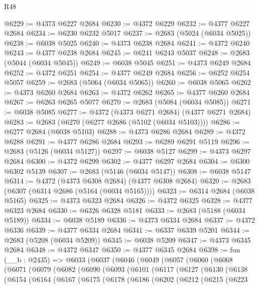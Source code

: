 \begin{lexlean}{R48}
\begin{coremodule}
@6229 := @4373 @6227 @2684
@6230 := @4372 @6229
@6232 := @4377 @6227 @2684
@6234 := @6230 @6232 @5017
@6237 := @2683 (@5024 (@6034 @5025))
@6238 := @6038 @5025
@6240 := @4373 @6238 @2684
@6241 := @4372 @6240
@6243 := @4377 @6238 @2684
@6245 := @6241 @6243 @5037
@6248 := @2683 (@5044 (@6034 @5045))
@6249 := @6038 @5045
@6251 := @4373 @6249 @2684
@6252 := @4372 @6251
@6254 := @4377 @6249 @2684
@6256 := @6252 @6254 @5057
@6259 := @2683 (@5064 (@6034 @5065))
@6260 := @6038 @5065
@6262 := @4373 @6260 @2684
@6263 := @4372 @6262
@6265 := @4377 @6260 @2684
@6267 := @6263 @6265 @5077
@6270 := @2683 (@5084 (@6034 @5085))
@6271 := @6038 @5085
@6277 := @4372 (@4373 @6271 @2684) (@4377 @6271 @2684)
@6283 := @2683 (@6270 (@6277 @2686 (@5102 (@6034 @5103))))
@6286 := @6277 @2684 (@6038 @5103)
@6288 := @4373 @6286 @2684
@6289 := @4372 @6288
@6291 := @4377 @6286 @2684
@6293 := @6289 @6291 @5119
@6296 := @2683 (@5126 (@6034 @5127))
@6297 := @6038 @5127
@6299 := @4373 @6297 @2684
@6300 := @4372 @6299
@6302 := @4377 @6297 @2684
@6304 := @6300 @6302 @5139
@6307 := @2683 (@5146 (@6034 @5147))
@6308 := @6038 @5147
@6314 := @4372 (@4373 @6308 @2684) (@4377 @6308 @2684)
@6320 := @2683 (@6307 (@6314 @2686 (@5164 (@6034 @5165))))
@6323 := @6314 @2684 (@6038 @5165)
@6325 := @4373 @6323 @2684
@6326 := @4372 @6325
@6328 := @4377 @6323 @2684
@6330 := @6326 @6328 @5181
@6333 := @2683 (@5188 (@6034 @5189))
@6334 := @6038 @5189
@6336 := @4373 @6334 @2684
@6337 := @4372 @6336
@6339 := @4377 @6334 @2684
@6341 := @6337 @6339 @5201
@6344 := @2683 (@5208 (@6034 @5209))
@6345 := @6038 @5209
@6347 := @4373 @6345 @2684
@6348 := @4372 @6347
@6350 := @4377 @6345 @2684
@6398 := fun (__b : @2435) =>
  @6033
    (@6037
      (@6046
        (@6049
          (@6057
            (@6060
              (@6068
                (@6071
                  (@6079
                    (@6082
                      (@6090
                        (@6093
                          (@6101
                            (@6117
                              (@6127
                                (@6130
                                  (@6138
                                    (@6154
                                      (@6164
                                        (@6167
                                          (@6175
                                            (@6178
                                              (@6186
                                                (@6202
                                                  (@6212
                                                    (@6215
                                                      (@6223

\end{coremodule}
\end{lexlean}
